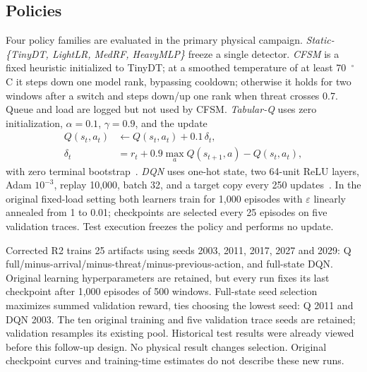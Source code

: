 \subsection{Policies}
Four policy families are evaluated in the primary physical campaign. \emph{Static-\{TinyDT, LightLR, MedRF, HeavyMLP\}} freeze a single detector. \emph{CFSM} is a fixed heuristic initialized to TinyDT; at a smoothed temperature of at least 70~$^{\circ}$C it steps down one model rank, bypassing cooldown; otherwise it holds for two windows after a switch and steps down/up one rank when threat crosses 0.7. Queue and load are logged but not used by CFSM. \emph{Tabular-Q} uses zero initialization, $\alpha=0.1$, $\gamma=0.9$, and the update
\begin{equation}
    \begin{aligned}
        Q(s_t,a_t) &\leftarrow Q(s_t,a_t) + 0.1\,\delta_t,\\
        \delta_t &= r_t + 0.9\max_a Q(s_{t+1},a) - Q(s_t,a_t),
    \end{aligned}
\end{equation}
with zero terminal bootstrap~\cite{Watkins1992}. \emph{DQN} uses one-hot state, two 64-unit ReLU layers, Adam $10^{-3}$, replay 10{,}000, batch 32, and a target copy every 250 updates~\cite{Mnih2015}. In the original fixed-load setting both learners train for 1{,}000 episodes with $\varepsilon$ linearly annealed from 1 to 0.01; checkpoints are selected every 25 episodes on five validation traces. Test execution freezes the policy and performs no update.

Corrected R2 trains 25 artifacts using seeds 2003, 2011, 2017, 2027 and 2029: Q full/minus-arrival/minus-threat/minus-previous-action, and full-state DQN. Original learning hyperparameters are retained, but every run fixes its last checkpoint after 1,000 episodes of 500 windows. Full-state seed selection maximizes summed validation reward, ties choosing the lowest seed: Q 2011 and DQN 2003. The ten original training and five validation trace seeds are retained; validation resamples its existing pool. Historical test results were already viewed before this follow-up design. No physical result changes selection. Original checkpoint curves and training-time estimates do not describe these new runs.

